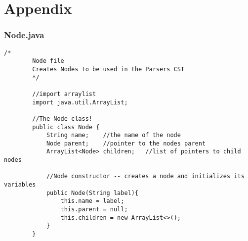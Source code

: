 \documentclass[letterpaper, 10pt,DIV=13]{scrartcl}
\numberwithin{equation}{section} %
\numberwithin{figure}{section} %
\numberwithin{table}{section} %
\begin{document}
\section{Appendix}

\subsubsection*{Node.java}
    \lstset{numbers=left, numberstyle=\tiny, stepnumber=1, numbersep=5pt, basicstyle=\footnotesize\ttfamily}
    \begin{lstlisting}[frame=single, ]
        /*
        Node file
        Creates Nodes to be used in the Parsers CST
        */
        
        //import arraylist
        import java.util.ArrayList;
        
        //The Node class!
        public class Node {
            String name;    //the name of the node
            Node parent;    //pointer to the nodes parent
            ArrayList<Node> children;   //list of pointers to child nodes
        
            //Node constructor -- creates a node and initializes its variables
            public Node(String label){
                this.name = label;
                this.parent = null;
                this.children = new ArrayList<>();
            }   
        }

    \end{lstlisting}
\end{document}
